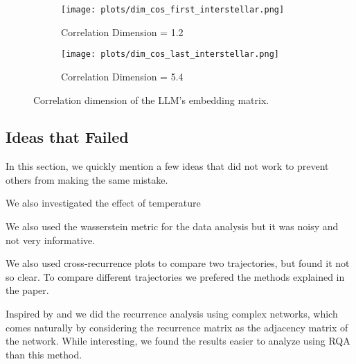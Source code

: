 \documentclass[a4paper,12pt]{article}
\begin{document}
\begin{figure}[H]
    \centering
    \begin{subfigure}[b]{0.48\linewidth}
        \centering
        \texttt{[image: plots/dim\_cos\_first\_interstellar.png]}
        \caption{Correlation Dimension = 1.2}
    \end{subfigure}\hfill
    \begin{subfigure}[b]{0.48\linewidth}
        \centering
        \texttt{[image: plots/dim\_cos\_last\_interstellar.png]}
        \caption{Correlation Dimension = 5.4}
    \end{subfigure}
    \caption{Correlation dimension of the LLM's embedding matrix.}
    \label{fig:embedding_dim}
\end{figure}


\subsection{Ideas that Failed}
\label{subsec:appendix_failed_ideas} %
In this section, we quickly mention a few ideas that did not work to prevent others from making the same mistake.

We also investigated the effect of temperature

We also used the wasserstein metric for the data analysis but it was noisy and not very informative.

We also used cross-recurrence plots to compare two trajectories, but found it not so clear. To compare different trajectories we prefered the methods explained in the paper.

Inspired by \cite{DONNER_2011} and \cite{Donner_2010} \cite{ZOU20191} we did the recurrence analysis using complex networks, which comes naturally by considering the recurrence matrix as the adjacency matrix of the network. While interesting, we found the results easier to analyze using RQA than this method. %
\end{document}
